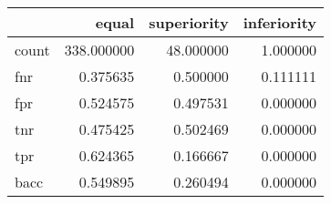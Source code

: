 \begin{tabular}{lrrr}
\toprule
{} &       equal &  superiority &  inferiority \\
\midrule
count &  338.000000 &    48.000000 &     1.000000 \\
fnr   &    0.375635 &     0.500000 &     0.111111 \\
fpr   &    0.524575 &     0.497531 &     0.000000 \\
tnr   &    0.475425 &     0.502469 &     0.000000 \\
tpr   &    0.624365 &     0.166667 &     0.000000 \\
bacc  &    0.549895 &     0.260494 &     0.000000 \\
\bottomrule
\end{tabular}
